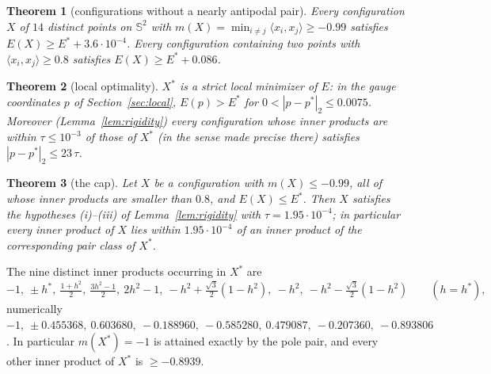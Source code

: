 \documentclass[11pt]{article}
\newtheorem{theorem}{Theorem}[section]
\theoremstyle{definition}
\newcommand{\Sph}{\mathbb{S}^2}
\newcommand{\ip}[2]{\langle #1,#2\rangle}
\newcommand{\Xs}{X^{\ast}}
\newcommand{\Es}{E^{\ast}}
\newcommand{\hs}{h^{\ast}}
\newcommand{\TUBE}{1.95\cdot10^{-4}}        %
\begin{document}
\begin{theorem}[configurations without a nearly antipodal pair]\label{thm:A}
Every configuration $X$ of $14$ distinct points on $\Sph$ with $m(X)=\min_{i\ne j}\ip{x_i}{x_j}\ge-0.99$ satisfies
$E(X)\ge\Es+3.6\cdot10^{-4}$. Every configuration containing two points with $\ip{x_i}{x_j}\ge0.8$ satisfies
$E(X)\ge\Es+0.086$.
\end{theorem}

\begin{theorem}[local optimality]\label{thm:B}
$\Xs$ is a strict local minimizer of $E$: in the gauge coordinates $p$ of Section~\ref{sec:local},
$E(p)>\Es$ for $0<|p-p^\ast|_2\le0.0075$. Moreover (Lemma~\ref{lem:rigidity}) every configuration whose inner products
are within $\tau\le10^{-3}$ of those of $\Xs$ (in the sense made precise there) satisfies $|p-p^\ast|_2\le23\,\tau$.
\end{theorem}

\begin{theorem}[the cap]\label{thm:C}
Let $X$ be a configuration with $m(X)\le-0.99$, all of whose inner products are smaller than $0.8$, and $E(X)\le\Es$. Then
$X$ satisfies the hypotheses (i)--(iii) of Lemma~\ref{lem:rigidity} with $\tau=\TUBE$; in particular every inner product
of $X$ lies within $\TUBE$ of an inner product of the corresponding pair class of $\Xs$.
\end{theorem}

The nine distinct inner products occurring in $\Xs$ are
\begin{equation}\label{eq:nodes}
 -1,\ \pm\hs,\ \tfrac{1+h^{2}}{2},\ \tfrac{3h^2-1}{2},\ 2h^2-1,\ -h^2+\tfrac{\sqrt3}{2}(1-h^2),\ -h^2,\ -h^2-\tfrac{\sqrt3}{2}(1-h^2)
 \qquad(h=\hs),
\end{equation}
numerically $-1,\ \pm0.455368,\ 0.603680,\ -0.188960,\ -0.585280,\ 0.479087,\ -0.207360,\ -0.893806$.
In particular $m(\Xs)=-1$ is attained exactly by the pole pair, and every other inner product of $\Xs$ is $\ge -0.8939$.

\end{document}
